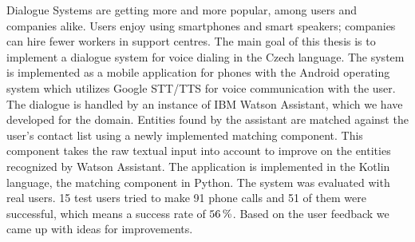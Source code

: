 \documentclass[12pt]{report}
\begin{document}

Dialogue Systems are getting more and more popular, among users and companies alike.
Users enjoy using smartphones and smart speakers; companies can hire fewer workers in support
centres. The main goal of this thesis is to implement a dialogue system for voice dialing in
the Czech language. The system is implemented as a mobile application for phones with
the Android operating system which utilizes Google STT/TTS for voice communication
with the user. The dialogue is handled by an instance of IBM Watson Assistant, which we
have developed for the domain. Entities found by the assistant are matched against the
user's contact list using a newly implemented matching component. This component takes
the raw textual input into account to improve on the entities recognized by Watson Assistant.
The application is implemented in the Kotlin language, the matching component in Python.
The system was evaluated with real users. 15 test users tried to make 91 phone
calls and 51 of them were successful, which means a success rate of \(56\,\rm \%\). Based on the
user feedback we came up with ideas for improvements.
\end{document}
